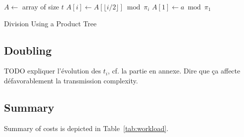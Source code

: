 \documentclass[11pt]{llncs}
\begin{document}
\begin{algorithm}
\newcommand{\vstart}{\ensuremath{\mathrm{start}}}
\newcommand{\vmid}{\ensuremath{\mathrm{mid}}}
\newcommand{\vend}{\ensuremath{\mathrm{end}}}
\begin{algorithmic}[1]
\State $A \gets $ array of size $t$
    \State $A[i] \gets A[\lfloor i/2 \rfloor] \bmod \pi_i$
    \State {}
    \State {}
  \EndIf
\EndFunction
\State $A[1] \gets a \bmod \pi_1$
\State {}
\State {}
\end{algorithmic}
\caption{Division Using a Product Tree}\label{alg:div-prod-tree}
\end{algorithm}

\subsection{Doubling}
\label{sec:doubling}



TODO expliquer l'évolution des $t_i$, cf. la partie en annexe. Dire que ça affecte défavorablement la transmission complexity.

\subsection{Summary}

Summary of costs is depicted in Table~\ref{tab:workload}.
\end{document}
